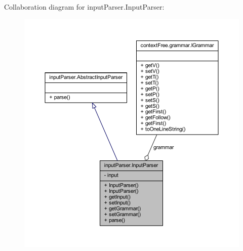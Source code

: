 Collaboration diagram for input\-Parser.\-Input\-Parser\-:
\nopagebreak
\begin{figure}[H]
\begin{center}
\leavevmode
\includegraphics[width=350pt]{classinput_parser_1_1_input_parser__coll__graph}
\end{center}
\end{figure}
